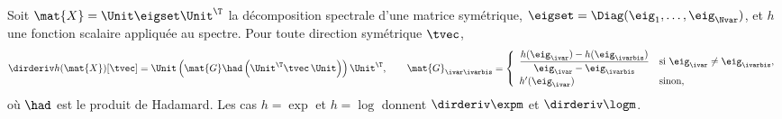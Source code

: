 \begin{proposition}
\label{prop:spdnet-diffm}
  Soit $\mat{X}=\Unit\eigset\Unit^\T$ la décomposition spectrale d'une matrice
  symétrique, $\eigset=\Diag(\eig_1,\dots,\eig_\Nvar)$, et $h$ une fonction
  scalaire appliquée au spectre. Pour toute direction symétrique $\tvec$,
  \begin{equation}
    \dirderiv h(\mat{X})[\tvec]
    =
    \Unit\left(\mat{G}\had\left(\Unit^\T\tvec\,\Unit\right)\right)\Unit^\T,
    \qquad
    \mat{G}_{\ivar\ivarbis}
    =
    \left\{
    \begin{array}{ll}
      \dfrac{h(\eig_\ivar)-h(\eig_\ivarbis)}{\eig_\ivar-\eig_\ivarbis}
        & \text{si } \eig_\ivar\neq\eig_\ivarbis,\\[8pt]
      h'(\eig_\ivar) & \text{sinon,}
    \end{array}
    \right.
    \label{eq:spdnet-daleckii}
  \end{equation}
  où $\had$ est le produit de Hadamard. Les cas $h=\exp$ et $h=\log$ donnent
  $\dirderiv\expm$ et $\dirderiv\logm$.
\end{proposition}


